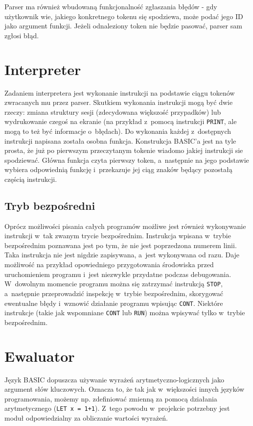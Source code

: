 \documentclass[shortabstract]{iithesis}
\begin{document}
Parser ma również wbudowaną funkcjonalność zgłaszania błędów - gdy użytkownik wie, jakiego konkretnego tokenu się spodziewa, może podać jego ID jako argument funkcji. Jeżeli odnaleziony token nie będzie pasować, parser sam zgłosi błąd.

\section{Interpreter}
Zadaniem interpretera jest wykonanie instrukcji na podstawie ciągu tokenów zwracanych mu przez parser. Skutkiem wykonania instrukcji mogą być dwie rzeczy: zmiana struktury sesji (zdecydowana większość przypadków) lub wydrukowanie czegoś na ekranie (na przykład z~pomocą instrukcji \texttt{PRINT}, ale mogą to też być informacje o~błędach). Do wykonania każdej z~dostępnych instrukcji napisana została osobna funkcja. Konstrukcja BASIC'a jest na tyle prosta, że już po pierwszym przeczytanym tokenie wiadomo jakiej instrukcji sie spodziewać. Główna funkcja czyta pierwszy token, a~następnie na jego podstawie wybiera odpowiednią funkcję i~przekazuje jej ciąg znaków będący pozostałą częścią instrukcji.
\subsection{Tryb bezpośredni}
Oprócz możliwości pisania całych programów możliwe jest również wykonywanie instrukcji w~tak zwanym trycie bezpośrednim. Instrukcja wpisana w~trybie bezpośrednim poznawana jest po tym, że nie jest poprzedzona numerem linii. Taka instrukcja nie jest nigdzie zapisywana, a~jest wykonywana od razu. Daje możliwość na przykład opowiedniego przygotowania środowiska przed uruchomieniem programu i~jest niezwykle przydatne podczas debugowania. W~dowolnym momencie programu można się zatrzymać instrukcją \texttt{STOP}, a~następnie przeprowadzić inspekcję w~trybie bezpośrednim, skorygować ewentualne błędy i~wznowić działanie programu wpisując \texttt{CONT}. Niektóre instrukcje (takie jak wspomniane \texttt{CONT} lub \texttt{RUN}) można wpisywać tylko w~trybie bezpośrednim.

\section{Ewaluator}
Język BASIC dopuszcza używanie wyrażeń arytmetyczno-logicznych jako argument słów kluczowych. Oznacza to, że tak jak w~większości innych języków programowania, możemy np. zdefiniować zmienną za pomocą działania arytmetycznego (\texttt{LET x = 1+1}). Z~tego powodu w~projekcie potrzebny jest moduł odpowiedzialny za obliczanie wartości wyrażeń.
\end{document}

